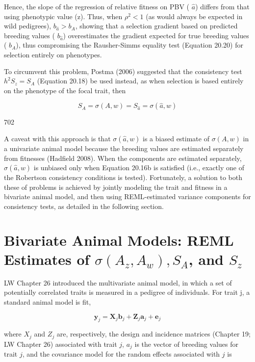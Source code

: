 \documentclass{article}
\begin{document}
Hence, the slope of the regression of relative fitness on PBV ( $ \hat{a} $) differs from that using phenotypic value (z). Thus, when  $ \rho^2 < 1 $ (as would always be expected in wild pedigrees),  $ b_{\hat{a}} > b_A $, showing that a selection gradient based on predicted breeding values ( $ b_{\hat{a}} $) overestimates the gradient expected for true breeding values ( $ b_A $), thus compromising the Rausher-Simms equality test (Equation 20.20) for selection entirely on phenotypes.

To circumvent this problem, Postma (2006) suggested that the consistency test  $ h^{2}S_{z} = S_{A} $ (Equation 20.18) be used instead, as when selection is based entirely on the phenotype of the focal trait, then

\begin{equation}
S_{A}=\sigma(A,w)=S_{\hat{a}}=\sigma(\widehat{a},w)
\end{equation}

702

A caveat with this approach is that  $ \sigma(\widehat{a}, w) $ is a biased estimate of  $ \sigma(A, w) $ in a univariate animal model because the breeding values are estimated separately from fitnesses (Hadfield 2008). When the components are estimated separately,  $ \sigma(\widehat{a}, w) $ is unbiased only when Equation 20.16b is satisfied (i.e., exactly one of the Robertson consistency conditions is tested). Fortunately, a solution to both these of problems is achieved by jointly modeling the trait and fitness in a bivariate animal model, and then using REML-estimated variance components for consistency tests, as detailed in the following section.

\section{Bivariate Animal Models: REML Estimates of  $ \sigma(A_{z}, A_{w}), S_{A} $, and  $ S_{z} $}
LW Chapter 26 introduced the multivariate animal model, in which a set of potentially correlated traits is measured in a pedigree of individuals. For trait j, a standard animal model is fit,

\begin{equation}
\mathbf{y}_{j}=\mathbf{X}_{j}\mathbf{b}_{j}+\mathbf{Z}_{j}\mathbf{a}_{j}+\mathbf{e}_{j}
\tag{20.26a}
\label{eq:20_26a}
\end{equation}

where  $ X_j $ and  $ Z_j $ are, respectively, the design and incidence matrices (Chapter 19; LW Chapter 26) associated with trait  $ j $,  $ a_j $ is the vector of breeding values for trait  $ j $, and the covariance model for the random effects associated with  $ j $ is
\end{document}
